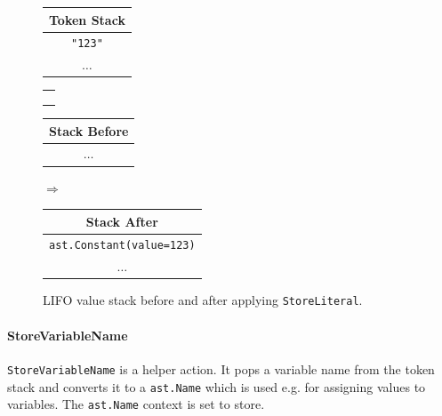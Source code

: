 \begin{figure}[H]\label{fig:storeliteral-stack}
  \centering
  {\small

  \begin{tabular}{|c|}
    \hline
    \textbf{Token Stack} \\ \hline
    \texttt{"123"}       \\ \hline
    \(\dots\)            \\ \hline
  \end{tabular}
  \begin{tabular}{|c}
    \\
    \\
    \\
    \\
  \end{tabular}
  \begin{tabular}{|c|}
    \hline
    \textbf{Stack Before} \\ \hline
    \(\dots\)             \\ \hline
  \end{tabular}
  \hspace{0.25em}$\Longrightarrow$\hspace{0.25em}
  \begin{tabular}{|c|}
    \hline
    \textbf{Stack After} \\ \hline
    \texttt{\tiny{ast.}}\texttt{Constant(value=123)} \\ \hline
    \(\dots\)                       \\ \hline
  \end{tabular}
  }
  \caption{LIFO value stack before and after applying \texttt{StoreLiteral}.}
  
\end{figure}

\paragraph{StoreVariableName}
\texttt{StoreVariableName} is a helper action. It pops a variable name from the token stack and converts it to a \texttt{ast.Name} which is used e.g. for assigning values to variables. The \texttt{ast.Name} context is set to store.

